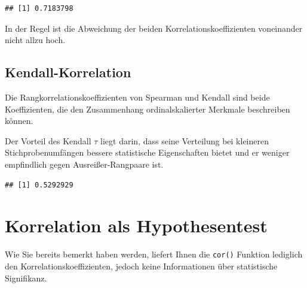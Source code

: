 \documentclass[
]{book}
\newenvironment{Shaded}{\begin{snugshade}}{\end{snugshade}}
\newcommand{\AttributeTok}[1]{\textcolor[rgb]{0.77,0.63,0.00}{#1}}
\newcommand{\FunctionTok}[1]{\textcolor[rgb]{0.00,0.00,0.00}{#1}}
\newcommand{\NormalTok}[1]{#1}
\newcommand{\SpecialCharTok}[1]{\textcolor[rgb]{0.00,0.00,0.00}{#1}}
\newcommand{\StringTok}[1]{\textcolor[rgb]{0.31,0.60,0.02}{#1}}
\begin{document}
\begin{Shaded}
\end{Shaded}

\begin{verbatim}
## [1] 0.7183798
\end{verbatim}

In der Regel ist die Abweichung der beiden Korrelationskoeffizienten voneinander nicht allzu hoch.

\hypertarget{kendall-korrelation}{%
\subsection{Kendall-Korrelation}\label{kendall-korrelation}}

Die Rangkorrelationskoeffizienten von Spearman und Kendall sind beide Koeffizienten, die den Zusammenhang ordinalskalierter Merkmale beschreiben können.

Der Vorteil des Kendall \(τ\) liegt darin, dass seine Verteilung bei kleineren Stichprobenumfängen bessere statistische Eigenschaften bietet und er weniger empfindlich gegen Ausreißer-Rangpaare ist.

\begin{Shaded}
\end{Shaded}

\begin{verbatim}
## [1] 0.5292929
\end{verbatim}

\hypertarget{korrelation-als-hypothesentest}{%
\section{Korrelation als Hypothesentest}\label{korrelation-als-hypothesentest}}

Wie Sie bereits bemerkt haben werden, liefert Ihnen die \texttt{cor()} Funktion lediglich den Korrelationskoeffizienten, jedoch keine Informationen über statistische Signifikanz.
\end{document}
